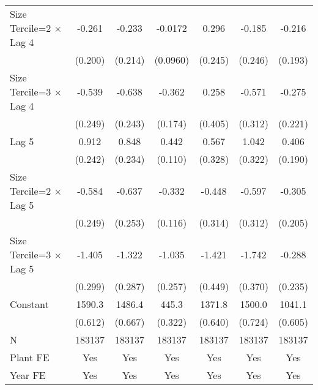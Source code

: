 \begin{table}[htbp]
\begin{tabular}{l*{6}{c}}
\addlinespace
Size Tercile=2 $\times$ Lag 4&   -0.261         &   -0.233         &  -0.0172         &    0.296         &   -0.185         &   -0.216         \\
                &  (0.200)         &  (0.214)         & (0.0960)         &  (0.245)         &  (0.246)         &  (0.193)         \\
\addlinespace
Size Tercile=3 $\times$ Lag 4&   -0.539\sym{*}  &   -0.638\sym{**} &   -0.362\sym{*}  &    0.258         &   -0.571         &   -0.275         \\
                &  (0.249)         &  (0.243)         &  (0.174)         &  (0.405)         &  (0.312)         &  (0.221)         \\
\addlinespace
Lag 5           &    0.912\sym{***}&    0.848\sym{***}&    0.442\sym{***}&    0.567         &    1.042\sym{**} &    0.406\sym{*}  \\
                &  (0.242)         &  (0.234)         &  (0.110)         &  (0.328)         &  (0.322)         &  (0.190)         \\
\addlinespace
Size Tercile=2 $\times$ Lag 5&   -0.584\sym{*}  &   -0.637\sym{*}  &   -0.332\sym{**} &   -0.448         &   -0.597         &   -0.305         \\
                &  (0.249)         &  (0.253)         &  (0.116)         &  (0.314)         &  (0.312)         &  (0.205)         \\
\addlinespace
Size Tercile=3 $\times$ Lag 5&   -1.405\sym{***}&   -1.322\sym{***}&   -1.035\sym{***}&   -1.421\sym{**} &   -1.742\sym{***}&   -0.288         \\
                &  (0.299)         &  (0.287)         &  (0.257)         &  (0.449)         &  (0.370)         &  (0.235)         \\
\addlinespace
Constant        &   1590.3\sym{***}&   1486.4\sym{***}&    445.3\sym{***}&   1371.8\sym{***}&   1500.0\sym{***}&   1041.1\sym{***}\\
                &  (0.612)         &  (0.667)         &  (0.322)         &  (0.640)         &  (0.724)         &  (0.605)         \\
\midrule
N               &   183137         &   183137         &   183137         &   183137         &   183137         &   183137         \\
Plant FE        &      Yes         &      Yes         &      Yes         &      Yes         &      Yes         &      Yes         \\
Year FE         &      Yes         &      Yes         &      Yes         &      Yes         &      Yes         &      Yes         \\

\end{tabular}
\end{table}
